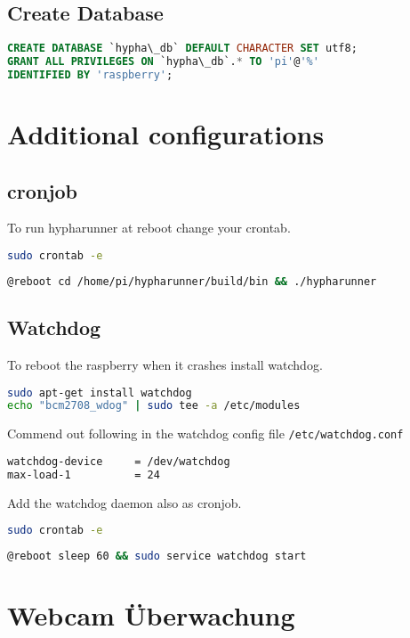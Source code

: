 \documentclass[german,a4paper,11pt]{report}
\begin{document}
\section{Create Database}
\begin{lstlisting}[language=sql,caption={create database}]
CREATE DATABASE `hypha\_db` DEFAULT CHARACTER SET utf8;
GRANT ALL PRIVILEGES ON `hypha\_db`.* TO 'pi'@'%'
IDENTIFIED BY 'raspberry';
\end{lstlisting}

\chapter{Additional configurations}
\section{cronjob}
To run hypharunner at reboot change your crontab.
\begin{lstlisting}[language=bash]
sudo crontab -e
\end{lstlisting}
\begin{lstlisting}[language=bash,caption={crontab}]
@reboot cd /home/pi/hypharunner/build/bin && ./hypharunner
\end{lstlisting}

\section{Watchdog}
To reboot the raspberry when it crashes install watchdog.
\begin{lstlisting}[language=bash,caption={watchdog}]
sudo apt-get install watchdog
echo "bcm2708_wdog" | sudo tee -a /etc/modules
\end{lstlisting}
Commend out following in the watchdog config file \texttt{/etc/watchdog.conf}
\begin{lstlisting}[language=bash,caption={/etc/watchdog.conf}]
watchdog-device		= /dev/watchdog
max-load-1			= 24
\end{lstlisting}
Add the watchdog daemon also as cronjob.
\begin{lstlisting}[language=bash]
sudo crontab -e
\end{lstlisting}
\begin{lstlisting}[language=bash,caption={crontab}]
@reboot sleep 60 && sudo service watchdog start
\end{lstlisting}


\chapter{Webcam Überwachung}
\end{document}
